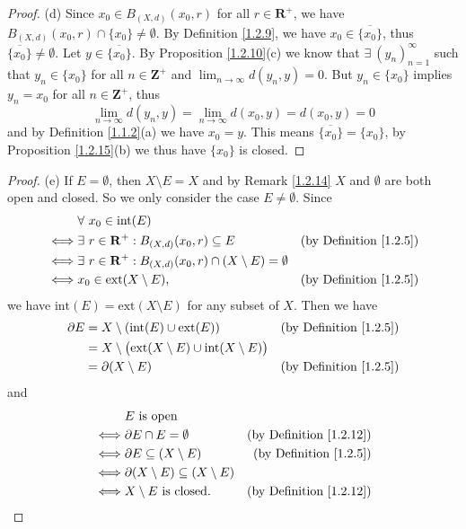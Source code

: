 \begin{proof}{(d)}
    Since \(x_0 \in B_{(X, d)}(x_0, r)\) for all \(r \in \mathbf{R}^+\), we have \(B_{(X, d)}(x_0, r) \cap \{x_0\} \neq \emptyset\).
    By Definition \ref{1.2.9}, we have \(x_0 \in \overline{\{x_0\}}\), thus \(\overline{\{x_0\}} \neq \emptyset\).
    Let \(y \in \overline{\{x_0\}}\).
    By Proposition \ref{1.2.10}(c) we know that \(\exists\ (y_n)_{n = 1}^\infty\) such that \(y_n \in \{x_0\}\) for all \(n \in \mathbf{Z}^+\) and \(\lim_{n \to \infty} d(y_n, y) = 0\).
    But \(y_n \in \{x_0\}\) implies \(y_n = x_0\) for all \(n \in \mathbf{Z}^+\), thus
    \[
        \lim_{n \to \infty} d(y_n, y) = \lim_{n \to \infty} d(x_0, y) = d(x_0, y) = 0
    \]
    and by Definition \ref{1.1.2}(a) we have \(x_0 = y\).
    This means \(\overline{\{x_0\}} = \{x_0\}\), by Proposition \ref{1.2.15}(b) we thus have \(\{x_0\}\) is closed.
\end{proof}

\begin{proof}{(e)}
    If \(E = \emptyset\), then \(X \setminus E = X\) and by Remark \ref{1.2.14} \(X\) and \(\emptyset\) are both open and closed.
    So we only consider the case \(E \neq \emptyset\).
    Since
    \begin{align*}
        & \forall\ x_0 \in \text{int}(E) \\
        \iff & \exists\ r \in \mathbf{R}^+ : B_{(X, d)}(x_0, r) \subseteq E & \text{(by Definition \ref{1.2.5})} \\
        \iff & \exists\ r \in \mathbf{R}^+ : B_{(X, d)}(x_0, r) \cap (X \setminus E) = \emptyset \\
        \iff & x_0 \in \text{ext}(X \setminus E), & \text{(by Definition \ref{1.2.5})}
    \end{align*}
    we have \(\text{int}(E) = \text{ext}(X \setminus E)\) for any subset of \(X\).
    Then we have
    \begin{align*}
        \partial E & = X \setminus (\text{int}(E) \cup \text{ext}(E)) & \text{(by Definition \ref{1.2.5})} \\
        & = X \setminus \big(\text{ext}(X \setminus E) \cup \text{int}(X \setminus E)\big) \\
        & = \partial (X \setminus E) & \text{(by Definition \ref{1.2.5})}
    \end{align*}
    and
    \begin{align*}
        & E \text{ is open} \\
        \iff & \partial E \cap E = \emptyset & \text{(by Definition \ref{1.2.12})} \\
        \iff & \partial E \subseteq (X \setminus E) & \text{(by Definition \ref{1.2.5})} \\
        \iff & \partial (X \setminus E) \subseteq (X \setminus E) \\
        \iff & X \setminus E \text{ is closed}. & \text{(by Definition \ref{1.2.12})}
    \end{align*}
\end{proof}

